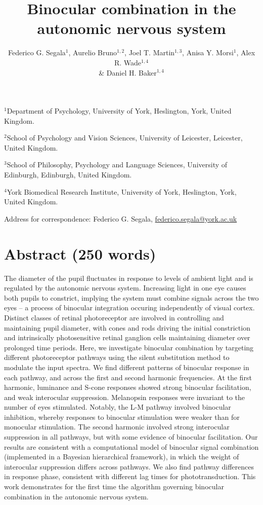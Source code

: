 \documentclass[
]{article}
\title{Binocular combination in the autonomic nervous system}
\author{Federico G. Segala\(^1\), Aurelio Bruno\(^{1,2}\), Joel T. Martin\(^{1,3}\), Anisa Y. Morsi\(^1\), Alex R. Wade\(^{1,4}\)\\
\& Daniel H. Baker\(^{1,4}\)}
\date{}
\begin{document}
\maketitle

\(^1\)Department of Psychology, University of York, Heslington, York, United Kingdom.

\(^2\)School of Psychology and Vision Sciences, University of Leicester, Leicester, United Kingdom.

\(^3\)School of Philosophy, Psychology and Language Sciences, University of Edinburgh, Edinburgh, United Kingdom.

\(^4\)York Biomedical Research Institute, University of York, Heslington, York, United Kingdom.

Address for correspondence: Federico G. Segala, \url{federico.segala@york.ac.uk}

\hypertarget{abstract-250-words}{%
\section{Abstract (250 words)}\label{abstract-250-words}}

The diameter of the pupil fluctuates in response to levels of ambient light and is regulated by the autonomic nervous system. Increasing light in one eye causes both pupils to constrict, implying the system must combine signals across the two eyes -- a process of binocular integration occuring independently of visual cortex. Distinct classes of retinal photoreceptor are involved in controlling and maintaining pupil diameter, with cones and rods driving the initial constriction and intrinsically photosensitive retinal ganglion cells maintaining diameter over prolonged time periods. Here, we investigate binocular combination by targeting different photoreceptor pathways using the silent substitution method to modulate the input spectra. We find different patterns of binocular response in each pathway, and across the first and second harmonic frequencies. At the first harmonic, luminance and S-cone responses showed strong binocular facilitation, and weak interocular suppression. Melanopsin responses were invariant to the number of eyes stimulated. Notably, the L-M pathway involved binocular inhibition, whereby responses to binocular stimulation were weaker than for monocular stimulation. The second harmonic involved strong interocular suppression in all pathways, but with some evidence of binocular facilitation. Our results are consistent with a computational model of binocular signal combination (implemented in a Bayesian hierarchical framework), in which the weight of interocular suppression differs across pathways. We also find pathway differences in response phase, consistent with different lag times for phototransduction. This work demonstrates for the first time the algorithm governing binocular combination in the autonomic nervous system.
\end{document}
